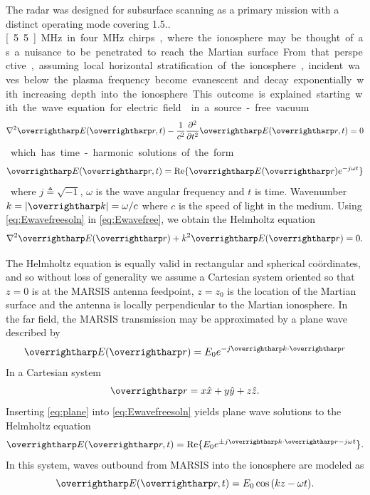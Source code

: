 The radar was designed for subsurface scanning as a primary mission with a distinct operating mode covering 1.5..\unit[5.5]{MHz} in four \unit[1]{MHz} chirps, where the ionosphere may be thought of as a nuisance to be penetrated to reach the Martian surface.
From that perspective, assuming local horizontal stratification of the ionosphere, incident waves below the plasma frequency become evanescent and decay exponentially with increasing depth into the ionosphere.
This outcome is explained starting with the wave equation for electric field  in a source-free vacuum
\begin{equation}\label{eq:Ewavefree}
\nabla^2 \vect{E}(\vect{r},t) - \frac{1}{c^2} \frac{\partial^2}{\partial t^2} \vect{E}(\vect{r},t) = 0
\end{equation}
which has time-harmonic solutions of the form
\begin{equation}\label{eq:Ewavefreesoln}
\vect{E}(\vect{r},t) = \textrm{Re}\lbrace \vect{E}(\vect{r}) e^{-j\omega t} \rbrace
\end{equation}
where $j\triangleq\sqrt{-1}$, $\omega$ is the wave angular frequency and $t$ is time.
Wavenumber $k=|\vect{k}|= \omega/c$ where $c$ is the speed of light in the medium.
Using \eqref{eq:Ewavefreesoln} in \eqref{eq:Ewavefree}, we obtain the Helmholtz equation
\begin{equation}\label{eq:helmholtz}
\nabla^2 \vect{E}(\vect{r}) + k^2 \vect{E}(\vect{r}) = 0.
\end{equation}

The Helmholtz equation is equally valid in rectangular and spherical coördinates, and so without loss of generality we assume a Cartesian system oriented so that $z=0$ is at the MARSIS antenna feedpoint, $z=z_0$ is the location of the Martian surface and the antenna is locally perpendicular to the Martian ionosphere.
In the far field, the MARSIS transmission may be approximated by a plane wave described by
\begin{equation}\label{eq:plane}
\vect{E}(\vect{r}) = E_0 e^{-j \vect{k} \cdot\vect{r}}
\end{equation}
In a Cartesian system
\begin{equation}\label{eq:rdef}
\vect{r} = x\hat{x} + y\hat{y} + z\hat{z}.
\end{equation}
Inserting \eqref{eq:plane} into \eqref{eq:Ewavefreesoln} yields plane wave solutions to the Helmholtz equation
\begin{equation}
\vect{E}(\vect{r},t) = \textrm{Re}\lbrace E_0 e^{\pm j \vect{k}\cdot\vect{r} - j \omega t} \rbrace.
\end{equation}
In this system, waves outbound from MARSIS into the ionosphere are modeled as
\begin{equation}
\vect{E}(\vect{r},t) = E_0 \cos{(kz - \omega t)}.
\end{equation}

